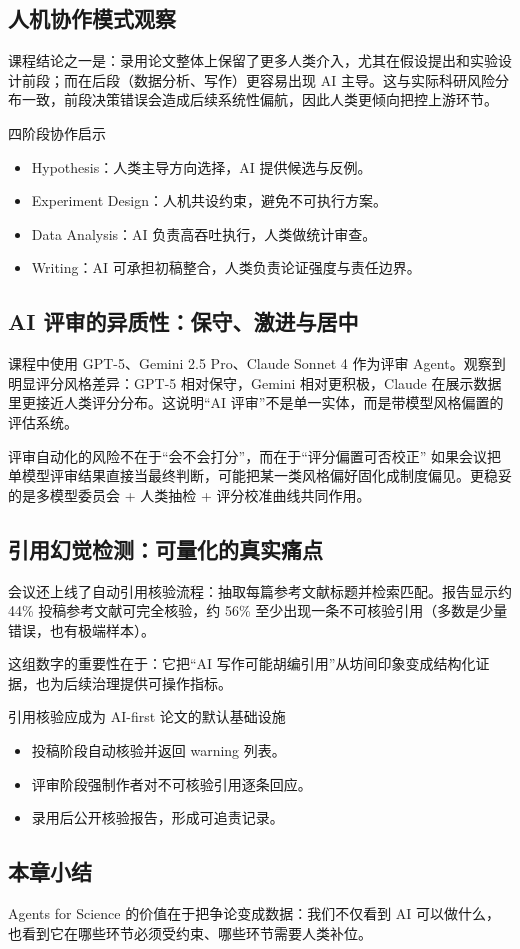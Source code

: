 \subsection{人机协作模式观察}

课程结论之一是：录用论文整体上保留了更多人类介入，尤其在假设提出和实验设计前段；而在后段（数据分析、写作）更容易出现 AI 主导。这与实际科研风险分布一致，前段决策错误会造成后续系统性偏航，因此人类更倾向把控上游环节。

\begin{knowledgebox}{四阶段协作启示}
\begin{itemize}
    \item Hypothesis：人类主导方向选择，AI 提供候选与反例。
    \item Experiment Design：人机共设约束，避免不可执行方案。
    \item Data Analysis：AI 负责高吞吐执行，人类做统计审查。
    \item Writing：AI 可承担初稿整合，人类负责论证强度与责任边界。
\end{itemize}
\end{knowledgebox}

\subsection{AI 评审的异质性：保守、激进与居中}

课程中使用 GPT-5、Gemini 2.5 Pro、Claude Sonnet 4 作为评审 Agent。观察到明显评分风格差异：GPT-5 相对保守，Gemini 相对更积极，Claude 在展示数据里更接近人类评分分布。这说明``AI 评审''不是单一实体，而是带模型风格偏置的评估系统。

\begin{warningbox}{评审自动化的风险不在于``会不会打分''，而在于``评分偏置可否校正''}
如果会议把单模型评审结果直接当最终判断，可能把某一类风格偏好固化成制度偏见。更稳妥的是多模型委员会 + 人类抽检 + 评分校准曲线共同作用。
\end{warningbox}

\subsection{引用幻觉检测：可量化的真实痛点}

会议还上线了自动引用核验流程：抽取每篇参考文献标题并检索匹配。报告显示约 44\% 投稿参考文献可完全核验，约 56\% 至少出现一条不可核验引用（多数是少量错误，也有极端样本）。

这组数字的重要性在于：它把``AI 写作可能胡编引用''从坊间印象变成结构化证据，也为后续治理提供可操作指标。

\begin{importantbox}{引用核验应成为 AI-first 论文的默认基础设施}
\begin{itemize}
    \item 投稿阶段自动核验并返回 warning 列表。
    \item 评审阶段强制作者对不可核验引用逐条回应。
    \item 录用后公开核验报告，形成可追责记录。
\end{itemize}
\end{importantbox}

\subsection{本章小结}

Agents for Science 的价值在于把争论变成数据：我们不仅看到 AI 可以做什么，也看到它在哪些环节必须受约束、哪些环节需要人类补位。

